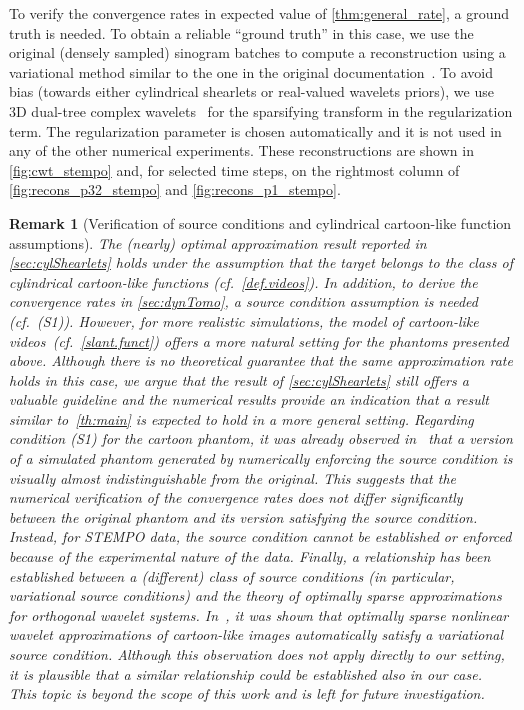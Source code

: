 \documentclass[11pt,a4paper]{article}
\numberwithin{equation}{section}
\newtheorem{remark}{Remark}[section]
\begin{document}
\begin{itemize}
To verify the convergence rates in expected value of \cref{thm:general_rate}, a ground truth is needed. To obtain a reliable ``ground truth'' in this case, we use the original (densely sampled) sinogram batches to compute a reconstruction using a variational method similar to the one in the original documentation~\cite{heikkila2022stempoDoc}. To avoid bias (towards either cylindrical shearlets or real-valued wavelets priors), we use 3D dual-tree complex wavelets~\cite{chen2011efficient} for the sparsifying transform in the regularization term. The regularization parameter is chosen automatically \cite{purisha2017controlled} and it is not used in any of the other numerical experiments. These reconstructions are shown in \cref{fig:cwt_stempo} and, for selected time steps, on the %
rightmost column of \cref{fig:recons_p32_stempo} and \cref{fig:recons_p1_stempo}.
\end{itemize}



\begin{remark}[Verification of source conditions and cylindrical cartoon-like function assumptions]
The (nearly) optimal approximation result reported in \cref{sec:cylShearlets} holds under the assumption that the target belongs to the class of cylindrical cartoon-like functions (cf.~\cref{def.videos}). In addition, to derive the convergence rates in \cref{sec:dynTomo}, a source condition assumption is needed (cf.~(S1)). However, 
for more realistic simulations, the model of cartoon-like videos~(cf.~\eqref{slant.funct}) offers a more natural setting for the phantoms presented above. Although there is no theoretical guarantee that the same approximation rate holds in this case, we argue that the result of \cref{sec:cylShearlets} still offers a valuable guideline and the numerical results provide an indication that a result similar to~\cref{th:main} is expected to hold in a more general setting.
Regarding condition (S1) for the cartoon phantom, it was already observed in~\cite{Bubba22} that a version of a simulated phantom generated by numerically enforcing the source condition is visually almost indistinguishable from the original. This suggests that the numerical verification of the convergence rates does not differ significantly between the original phantom and its version satisfying the source condition. Instead, for STEMPO data, the source condition cannot be established or enforced because of the experimental nature of the data.
Finally, a relationship has been established between a (different) class of source conditions (in particular, variational source conditions) and the theory of optimally sparse approximations for orthogonal wavelet systems. In~\cite{miller2021maximal}, it was shown that optimally sparse nonlinear wavelet approximations of cartoon-like images automatically satisfy a variational source condition. Although this observation does not apply directly to our setting, it is plausible that a similar relationship could be established also in our case. This topic is beyond the scope of this work and is left for future investigation.
\end{remark}
\end{document}
